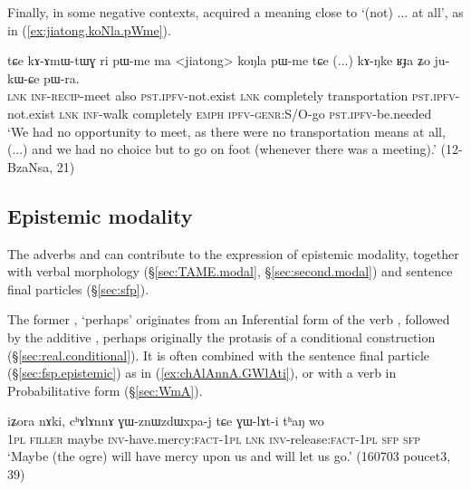 Finally, in some negative contexts,  acquired a meaning close to  `(not) ... at all', as in (\ref{ex:jiatong.koNla.pWme}).

\begin{exe}
\ex \label{ex:jiatong.koNla.pWme}
\gll  tɕe kɤ-ɤmɯ-tɯɣ ri pɯ-me ma <jiatong> koŋla pɯ-me tɕe (...) kɤ-ŋke ʁɟa ʑo ju-kɯ-ɕe pɯ-ra.  \\
\textsc{lnk} \textsc{inf}-\textsc{recip}-meet also \textsc{pst}.\textsc{ipfv}-not.exist \textsc{lnk} completely transportation \textsc{pst}.\textsc{ipfv}-not.exist \textsc{lnk} { } \textsc{inf}-walk completely \textsc{emph} \textsc{ipfv}-\textsc{genr}:S/O-go \textsc{pst}.\textsc{ipfv}-be.needed \\
\glt `We had no opportunity to meet, as there were no transportation means at all, (...) and we had no choice but to go on foot (whenever there was a meeting).' (12-BzaNsa, 21)
\end{exe} 


 \subsection{Epistemic modality}\label{sec:modality.adverbs}
 The adverbs  and   can contribute to the expression of epistemic modality, together with verbal morphology (§\ref{sec:TAME.modal}, §\ref{sec:second.modal}) and sentence final particles (§\ref{sec:sfp}).
 
 The former , `perhaps' originates from an Inferential form of the verb , followed by the additive , perhaps originally the protasis of a conditional construction (§\ref{sec:real.conditional}). It is often combined with the sentence final particle  (§\ref{sec:fsp.epistemic}) as in (\ref{ex:chAlAnnA.GWlAti}), or with a  verb in Probabilitative form (§\ref{sec:WmA}).
 
 \begin{exe}
\ex \label{ex:chAlAnnA.GWlAti}
\gll iʑora nɤki, cʰɤlɤnnɤ ɣɯ-znɯzdɯxpa-j tɕe ɣɯ-lɤt-i tʰaŋ wo \\
\textsc{1pl} \textsc{filler} maybe \textsc{inv}-have.mercy:\textsc{fact}-\textsc{1pl} \textsc{lnk} \textsc{inv}-release:\textsc{fact}-\textsc{1pl} \textsc{sfp} \textsc{sfp} \\
\glt `Maybe (the ogre) will have mercy upon us and will let us go.' (160703 poucet3, 39)
 \end{exe} 
 
